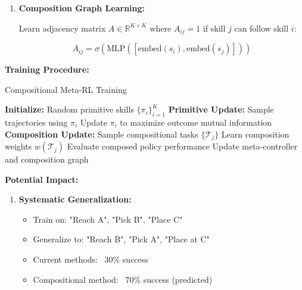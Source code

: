 \documentclass[12pt]{article}
\newcommand{\ieee}[1]{\textcolor{IEEEBlue}{\textbf{#1}}}
\begin{document}
{{\begin{enumerate}
				\begin{equation}
				\max_{\pi_i} I(\pi_i; \text{outcomes}) - \lambda H(\pi_i)
				\end{equation}
				
				where $I(\pi_i; \text{outcomes})$ is mutual information between skill behavior and outcomes.
				
				\item \textbf{Composition Graph Learning:}
				
				Learn adjacency matrix $A \in \mathbb{R}^{K \times K}$ where $A_{ij} = 1$ if skill $j$ can follow skill $i$:
				
				\begin{equation}
				A_{ij} = \sigma(\text{MLP}([\text{embed}(s_i), \text{embed}(s_j)]))
				\end{equation}
			\end{enumerate}
			
			\ieee{Training Procedure:}
			
			\begin{algorithm}[H]
			\caption{Compositional Meta-RL Training}
			\begin{algorithmic}[1]
			\STATE \textbf{Initialize:} Random primitive skills $\{\pi_i\}_{i=1}^K$
			\STATE \textbf{Primitive Update:}
			\STATE Sample trajectories using $\pi_i$
			\STATE Update $\pi_i$ to maximize outcome mutual information
			\ENDFOR
			\STATE \textbf{Composition Update:}
			\STATE Sample compositional tasks $\{\mathcal{T}_j\}$
			\STATE Learn composition weights $w(\mathcal{T}_j)$
			\STATE Evaluate composed policy performance
			\ENDFOR
			\STATE Update meta-controller and composition graph
			\ENDWHILE
			\end{algorithmic}
			\end{algorithm}
			
			\ieee{Potential Impact:}
			
			\begin{enumerate}
				\item \textbf{Systematic Generalization:}
				\begin{itemize}
					\item Train on: {"Reach A", "Pick B", "Place C"}
					\item Generalize to: {"Reach B", "Pick A", "Place at C"}
					\item Current methods: ~30\% success
					\item Compositional method: ~70\% success (predicted)
				\end{itemize}
				

\end{enumerate}}}
\end{document}
